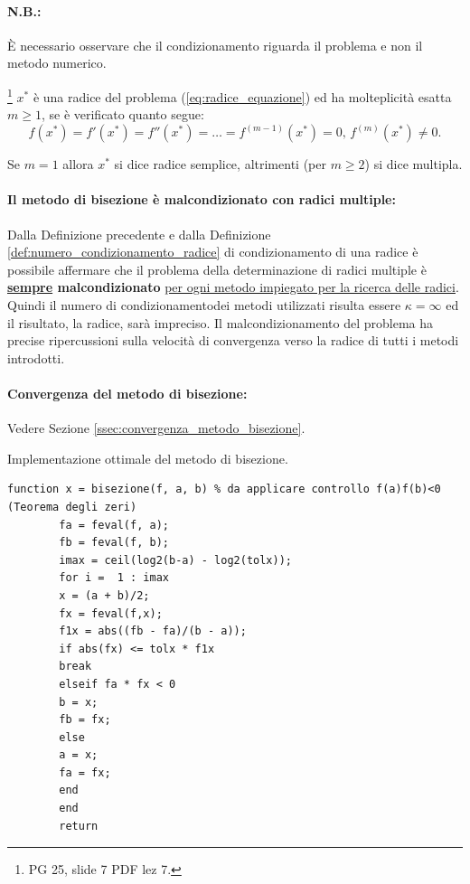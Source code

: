 \paragraph{N.B.:} È necessario osservare che il condizionamento riguarda il problema e non il \gls{metodo numerico}.

\begin{definition}\label{def:radice_molteplicita_m}
	\footnote{PG 25, slide 7 PDF lez 7.} $x^*$ è una radice del problema (\ref{eq:radice_equazione}) ed ha molteplicità esatta $m\geq 1$, se è verificato quanto segue:
	\begin{equation*}
		f(x^*)=f'(x^*)=f''(x^*)=\hdots=f^{(m-1)}(x^*)=0,\, f^{(m)}(x^*)\neq 0.
	\end{equation*}
\end{definition}
Se $m=1$ allora $x^*$ si dice radice semplice, altrimenti (per $m\geq 2$) si dice multipla.

\paragraph{Il metodo di bisezione è malcondizionato con radici multiple:} Dalla Definizione precedente e dalla Definizione \ref{def:numero_condizionamento_radice} di condizionamento di una radice è possibile affermare che il problema della determinazione di radici multiple è \textbf{\underline{sempre} malcondizionato} \uline{per ogni metodo impiegato per la ricerca delle radici}. Quindi  il numero di condizionamentodei metodi utilizzati risulta essere $\kappa=\infty$ ed il risultato, la radice, sarà impreciso. Il malcondizionamento del problema ha precise ripercussioni sulla velocità di convergenza verso la radice di tutti i metodi introdotti.

\paragraph{Convergenza del metodo di bisezione:} Vedere Sezione \ref{ssec:convergenza_metodo_bisezione}.

\begin{algorithm}\caption{Implementazione ottimale del metodo di bisezione.}
	\label{alg:metodo_bisezione}
	\begin{lstlisting}[style=Matlab-editor]
		function x = bisezione(f, a, b) % da applicare controllo f(a)f(b)<0 (Teorema degli zeri)
		fa = feval(f, a);
		fb = feval(f, b);
		imax = ceil(log2(b-a) - log2(tolx));
		for i =  1 : imax
		x = (a + b)/2;
		fx = feval(f,x);
		f1x = abs((fb - fa)/(b - a));
		if abs(fx) <= tolx * f1x
		break
		elseif fa * fx < 0
		b = x;
		fb = fx;
		else
		a = x;
		fa = fx;
		end
		end
		return
	\end{lstlisting}
\end{algorithm}

